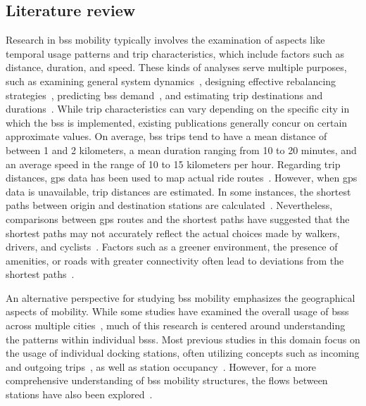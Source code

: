 \subsection{Literature review}

Research in \ac{bss} mobility typically involves the examination of aspects like temporal usage patterns and trip characteristics, which include factors such as distance, duration, and speed. These kinds of analyses serve multiple purposes, such as examining general system dynamics~\cite{Jensen2010, Ciancia2015, Zaltz2013}, designing effective rebalancing strategies~\cite{Chiariotti2018}, predicting \ac{bss} demand~\cite{Borgnat2011}, and estimating trip destinations and durations~\cite{Zhang2016Bicycle}. While trip characteristics can vary depending on the specific city in which the \ac{bss} is implemented, existing publications generally concur on certain approximate values. On average, \ac{bss} trips tend to have a mean distance of between 1 and 2 kilometers, a mean duration ranging from 10 to 20 minutes, and an average speed in the range of 10 to 15 kilometers per hour. Regarding trip distances, \ac{gps} data has been used to map actual ride routes~\cite{Talavera_Garcia2021}. However, when \ac{gps} data is unavailable, trip distances are estimated. In some instances, the shortest paths between origin and destination stations are calculated~\cite{Oliveira2016}. Nevertheless, comparisons between \ac{gps} routes and the shortest paths have suggested that the shortest paths may not accurately reflect the actual choices made by walkers, drivers, and cyclists~\cite{Zhu2015, Lu2018, Klein2023}. Factors such as a greener environment, the presence of amenities, or roads with greater connectivity often lead to deviations from the shortest paths~\cite{Klein2023}.

An alternative perspective for studying \ac{bss} mobility emphasizes the geographical aspects of mobility. While some studies have examined the overall usage of \acp{bss} across multiple cities~\cite{Zhao2014, DuranRodas2019, Sarkar2015}, much of this research is centered around understanding the patterns within individual \acp{bss}. Most previous studies in this domain focus on the usage of individual docking stations, often utilizing concepts such as incoming and outgoing trips~\cite{Moncayo2016, FaghihImani2014, Wang2016, FaghihImani2017Empirical, DuranRodas2019, Oliveira2016}, as well as station occupancy~\cite{OBrien2014, Sarkar2015}. However, for a more comprehensive understanding of \ac{bss} mobility structures, the flows between stations have also been explored~\cite{Corcoran2014, Yang2019, Kon2021}.

